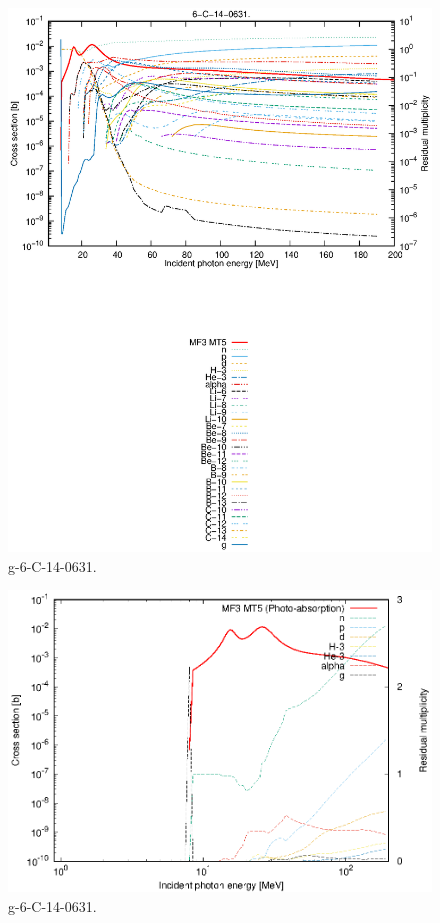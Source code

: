 \begin{figure}
 \includegraphics[width=\linewidth]{eps/g_6-C-14_0631.eps}
  \caption{g-6-C-14-0631.}
\end{figure}
\newpage \clearpage

\begin{figure}
 \includegraphics[width=\linewidth]{eps-log/g_6-C-14_0631.eps}
 \caption{g-6-C-14-0631.}
\end{figure}
\newpage \clearpage

